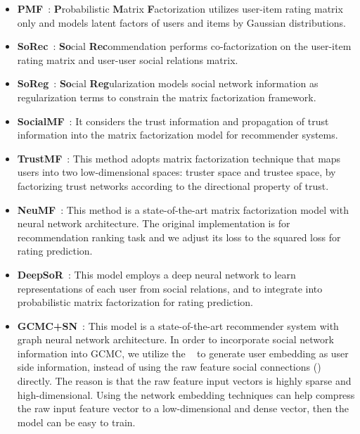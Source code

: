 \documentclass[sigconf]{acmart} \copyrightyear{2019}
\begin{document}
\begin{itemize}
  \item \textbf{PMF}~\cite{salakhutdinov2007probabilistic}: \textbf{P}robabilistic \textbf{M}atrix \textbf{F}actorization utilizes user-item rating matrix only and models latent factors of users and items by Gaussian distributions.
  \item \textbf{SoRec}~\cite{ma2008sorec}: \textbf{So}cial \textbf{Rec}ommendation performs co-factorization on the user-item rating matrix and user-user social relations matrix.
  \item \textbf{SoReg}~\cite{ma2011recommender}: \textbf{So}cial \textbf{Reg}ularization models social network information as regularization terms to constrain the matrix factorization framework.\item \textbf{SocialMF}~\cite{jamali2010matrix}: It considers the trust information and propagation of trust information into the matrix factorization model for recommender systems.
  \item \textbf{TrustMF}~\cite{yang2017social}: This method adopts matrix factorization technique that maps users into two low-dimensional spaces: truster space and trustee space, by factorizing trust networks according to the directional property of trust.
  \item \textbf{NeuMF}~\cite{He2017NCF}: This method is a state-of-the-art matrix factorization model with neural network architecture. The original implementation is for recommendation ranking task and we adjust its loss to the squared loss for rating prediction.
  \item \textbf{DeepSoR}~\cite{DeepSoR2018}: This model employs a deep neural network to learn representations of each user from social relations, and to integrate into probabilistic matrix factorization for rating prediction.
  \item \textbf{GCMC+SN}~\cite{berg2017graph}: This model is a state-of-the-art recommender system with graph neural network architecture. In order to incorporate social network information into GCMC, we utilize the ~\cite{grover2016node2vec} to generate user embedding as user side information, instead of using the raw feature social connections () directly. The reason is that the raw feature input vectors is highly sparse and high-dimensional. Using the network embedding techniques can help compress the raw input feature vector to a low-dimensional and dense vector, then the model can be easy to train.
\end{itemize}
\end{document}
